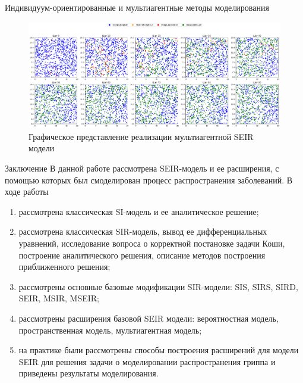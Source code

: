 \documentclass[notheorems]{beamer}
\begin{document}

\begin{frame}
	{Индивидуум-ориентированные и мультиагентные методы моделирования}
\begin{figure}
	\centering
	\includegraphics[scale=0.2]{images/graph04}
	\caption{Графическое представление реализации мультиагентной SEIR модели}
	\label{fig:graph04}
\end{figure}
\end{frame}


\begin{frame}
	{Заключение}
	В данной работе рассмотрена SEIR-модель и ее расширения, с помощью которых был смоделирован процесс распространения заболеваний.
В ходе работы
\begin{enumerate}
	\item рассмотрена классическая SI-модель и ее аналитическое решение;
	\item рассмотрена классическая SIR-модель, вывод ее дифференциальных уравнений, исследование вопроса о корректной постановке задачи Коши, построение аналитического решения, описание методов построения приближенного решения;
	\item рассмотрены основные базовые модификации SIR-модели: SIS, SIRS, SIRD, SEIR, MSIR, MSEIR;
	\item рассмотрены расширения базовой SEIR модели: вероятностная модель, пространственная модель, мультиагентная модель;
	\item на практике были рассмотрены способы построения расширений для модели SEIR для решения задачи о моделировании распространения гриппа и приведены результаты моделирования.
\end{enumerate}
\end{frame}

\end{document}

